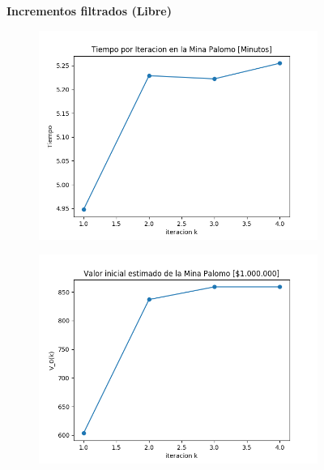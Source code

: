 \documentclass[12pt,letterpaper]{article}
\begin{document}
\begin{figure}[H]
  \captionsetup[subfigure]{labelformat=empty}
  \centering
  \textbf{Incrementos filtrados (Libre)}
  
  \begin{subfigure}[b]{0.4\textwidth}
     \includegraphics[width=\textwidth]{Graficos/Incrementos_filtrados/libre/palomo25_inc_times.png}
     \caption{}
     \label{fig:ex1}
  \end{subfigure}
  \begin{subfigure}[b]{0.4\textwidth}
     \includegraphics[width=\textwidth]{Graficos/Incrementos_filtrados/libre/palomo25_inc_v_k.png}
     \caption{}
     \label{fig:ex2}
  \end{subfigure}
  

\end{figure}
\end{document}
